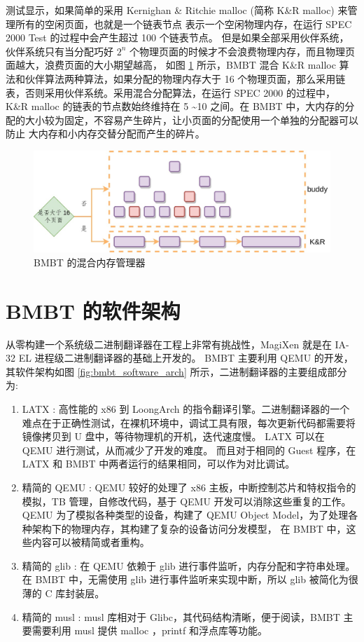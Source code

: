 测试显示，如果简单的采用 Kernighan \& Ritchie malloc (简称 K\&R malloc) 来管理所有的空闲页面，也就是一个链表节点
表示一个空闲物理内存，在运行 SPEC 2000 Test 的过程中会产生超过 100 个链表节点。
但是如果全部采用伙伴系统，伙伴系统只有当分配巧好 $2^n$ 个物理页面的时候才不会浪费物理内存，而且物理页面越大，浪费页面的大小期望越高，
如图 \ref{fig:kr_buddy} 所示，BMBT 混合 K\&R malloc 算法和伙伴算法两种算法，如果分配的物理内存大于 16 个物理页面，那么采用链表，否则采用伙伴系统。采用混合分配算法，在运行 SPEC 2000 的过程中，
K\&R malloc 的链表的节点数始终维持在 5 \textasciitilde 10 之间。在 BMBT 中，大内存的分配的大小较为固定，不容易产生碎片，让小页面的分配使用一个单独的分配器可以防止
大内存和小内存交替分配而产生的碎片。

\begin{figure}[!htbp]
	\centering
	\includegraphics[width=1.0\textwidth]{./images/KR-buddy.jpg}
	\caption{BMBT 的混合内存管理器}
	\label{fig:kr_buddy}
\end{figure}

\section{BMBT 的软件架构}
从零构建一个系统级二进制翻译器在工程上非常有挑战性，MagiXen 就是在 IA-32 EL 进程级二进制翻译器的基础上开发的。
BMBT 主要利用 QEMU 的开发，其软件架构如图 \ref{fig:bmbt_software_arch} 所示，二进制翻译器的主要组成部分为:
\begin{enumerate}
	\item LATX : 高性能的 x86 到 LoongArch 的指令翻译引擎。二进制翻译器的一个难点在于正确性测试，在裸机环境中，调试工具有限，每次更新代码都需要将镜像拷贝到 U 盘中，等待物理机的开机，迭代速度慢。
	      LATX 可以在 QEMU 进行测试，从而减少了开发的难度。
	      而且对于相同的 Guest 程序，在 LATX 和 BMBT 中两者运行的结果相同，可以作为对比调试。
	\item 精简的 QEMU : QEMU 较好的处理了 x86 主板，中断控制芯片和特权指令的模拟，TB 管理，自修改代码，基于 QEMU 开发可以消除这些重复的工作。
	      QEMU 为了模拟各种类型的设备，构建了 QEMU Object Model，为了处理各种架构下的物理内存，其构建了复杂的设备访问分发模型，
	      在 BMBT 中，这些内容可以被精简或者重构。
	\item 精简的 glib : 在 QEMU 依赖于 glib 进行事件监听，内存分配和字符串处理。在 BMBT 中，无需使用 glib 进行事件监听来实现中断，所以 glib 被简化为很薄的 C 库封装层。
	\item 精简的 musl : musl 库相对于 Glibc，其代码结构清晰，便于阅读，BMBT 主要需要利用 musl 提供 malloc ，printf 和浮点库等功能。
\end{enumerate}

